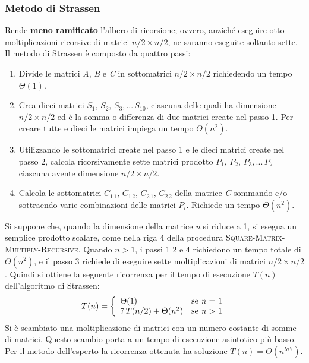 \documentclass[10pt, a4paper]{report}
\begin{document}
\subsubsection{Metodo di Strassen}
Rende \textbf{meno ramificato} l'albero di ricorsione; ovvero, anziché eseguire otto moltiplicazioni ricorsive di matrici  $n/2 \times n/2$, ne saranno eseguite soltanto sette. Il metodo di Strassen è composto da quattro passi:
\begin{enumerate}
\item Divide le matrici \textit{A}, \textit{B} e \textit{C} in sottomatrici $n/2 \times n/2$ richiedendo un tempo $\Theta(1)$.
\item Crea dieci matrici $S_1, \,S_2, \,S_3, ... \,S_{10}$, ciascuna delle quali ha dimensione $n/2 \times n/2$ ed è la somma o differenza di due matrici create nel passo 1. Per creare tutte e dieci le matrici impiega un tempo $\Theta(n^2)$.
\item Utilizzando le sottomatrici create nel passo 1 e le dieci matrici create nel passo 2, calcola ricorsivamente sette matrici prodotto  $P_1, \,P_2, \,P_3, ... \,P_{7}$ ciascuna avente dimensione $n/2 \times n/2$.
\item Calcola le sottomatrici $C_{1\,1}, \,C_{1\,2}, \,C_{2\,1}, \,C_{2\,2}$ della matrice \textit{C} sommando e/o sottraendo varie combinazioni delle matrici $P_i$. Richiede un tempo $\Theta(n^2)$.
\end{enumerate}
Si suppone che, quando la dimensione della matrice \textit{n} si riduce a 1, si esegua un semplice prodotto scalare, come nella riga 4 della procedura \textsc{Square-Matrix-Multiply-Recursive}. Quando $n > 1$, i passi 1 2 e 4 richiedono un tempo totale di $\Theta(n^2)$, e il passo 3 richiede di eseguire sette moltiplicazioni di matrici $n/2 \times n/2$. Quindi si ottiene la seguente ricorrenza per il tempo di esecuzione $T(n)$ dell'algoritmo di Strassen:
\begin{equation*}
T(n) = \left\{
\begin{array}{ll}
\Theta(1) & \text{se \textit{n} = 1} \\
7\,T(n/2) + \Theta(n^2) & \text{se \textit{n} $>$ 1}
\end{array}\right.
\end{equation*}
Si è scambiato una moltiplicazione di matrici con un numero costante di somme di matrici. Questo scambio porta a un tempo di esecuzione asintotico più basso. Per il metodo dell'esperto la ricorrenza ottenuta ha soluzione $T(n) = \Theta(n^{lg\,7})$.\\\\
\end{document}
